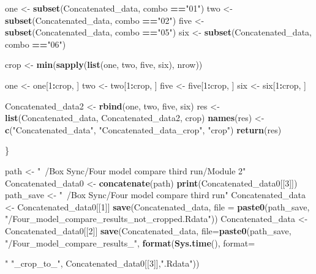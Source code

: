 \documentclass[]{book}
\newenvironment{Shaded}{\begin{snugshade}}{\end{snugshade}}
\newcommand{\KeywordTok}[1]{\textcolor[rgb]{0.13,0.29,0.53}{\textbf{{#1}}}}
\newcommand{\DataTypeTok}[1]{\textcolor[rgb]{0.13,0.29,0.53}{{#1}}}
\newcommand{\DecValTok}[1]{\textcolor[rgb]{0.00,0.00,0.81}{{#1}}}
\newcommand{\StringTok}[1]{\textcolor[rgb]{0.31,0.60,0.02}{{#1}}}
\newcommand{\OperatorTok}[1]{\textcolor[rgb]{0.81,0.36,0.00}{\textbf{{#1}}}}
\newcommand{\NormalTok}[1]{{#1}}
\theoremstyle{definition}
\theoremstyle{definition}
\theoremstyle{definition}
\theoremstyle{remark}
\begin{document}
\begin{Shaded}
\begin{Highlighting}[]
\NormalTok{ one <-}\StringTok{ }\KeywordTok{subset}\NormalTok{(Concatenated_data, combo }\OperatorTok{==}\StringTok{"01"}\NormalTok{)}
\NormalTok{ two <-}\StringTok{ }\KeywordTok{subset}\NormalTok{(Concatenated_data, combo }\OperatorTok{==}\StringTok{"02"}\NormalTok{)}
\NormalTok{ five <-}\StringTok{ }\KeywordTok{subset}\NormalTok{(Concatenated_data, combo }\OperatorTok{==}\StringTok{"05"}\NormalTok{)}
\NormalTok{ six <-}\StringTok{ }\KeywordTok{subset}\NormalTok{(Concatenated_data, combo }\OperatorTok{==}\StringTok{"06"}\NormalTok{)}

\NormalTok{ crop <-}\StringTok{ }\KeywordTok{min}\NormalTok{(}\KeywordTok{sapply}\NormalTok{(}\KeywordTok{list}\NormalTok{(one, two, five, six), nrow))}

\NormalTok{ one <-}\StringTok{ }\NormalTok{one[}\DecValTok{1}\OperatorTok{:}\NormalTok{crop, ]}
\NormalTok{ two <-}\StringTok{ }\NormalTok{two[}\DecValTok{1}\OperatorTok{:}\NormalTok{crop, ]}
\NormalTok{ five <-}\StringTok{ }\NormalTok{five[}\DecValTok{1}\OperatorTok{:}\NormalTok{crop, ]}
\NormalTok{ six <-}\StringTok{ }\NormalTok{six[}\DecValTok{1}\OperatorTok{:}\NormalTok{crop, ]}

\NormalTok{ Concatenated_data2 <-}\StringTok{ }\KeywordTok{rbind}\NormalTok{(one, two, five, six)}
\NormalTok{ res <-}\StringTok{ }\KeywordTok{list}\NormalTok{(Concatenated_data, Concatenated_data2, crop)}
 \KeywordTok{names}\NormalTok{(res) <-}\StringTok{ }\KeywordTok{c}\NormalTok{(}\StringTok{"Concatenated_data"}\NormalTok{, }\StringTok{"Concatenated_data_crop"}\NormalTok{, }\StringTok{"crop"}\NormalTok{)}
 \KeywordTok{return}\NormalTok{(res)}
 
\NormalTok{\}}

\NormalTok{path <-}\StringTok{ "~/Box Sync/Four model compare third run/Module 2"}
\NormalTok{Concatenated_data0 <-}\StringTok{ }\KeywordTok{concatenate}\NormalTok{(path)}
\KeywordTok{print}\NormalTok{(Concatenated_data0[[}\DecValTok{3}\NormalTok{]])}
\NormalTok{path_save <-}\StringTok{ "~/Box Sync/Four model compare third run"}
\NormalTok{Concatenated_data <-}\StringTok{ }\NormalTok{Concatenated_data0[[}\DecValTok{1}\NormalTok{]]}
\KeywordTok{save}\NormalTok{(Concatenated_data, }\DataTypeTok{file =} \KeywordTok{paste0}\NormalTok{(path_save,}
                                     \StringTok{"/Four_model_compare_results_not_cropped.Rdata"}\NormalTok{))}
\NormalTok{Concatenated_data <-}\StringTok{ }\NormalTok{Concatenated_data0[[}\DecValTok{2}\NormalTok{]]}
\KeywordTok{save}\NormalTok{(Concatenated_data, }\DataTypeTok{file=}\KeywordTok{paste0}\NormalTok{(path_save,}
                                   \StringTok{"/Four_model_compare_results_"}\NormalTok{, }
                                   \KeywordTok{format}\NormalTok{(}\KeywordTok{Sys.time}\NormalTok{(), }\DataTypeTok{format=}\StringTok{"%
                                   \StringTok{"_crop_to_"}\NormalTok{, Concatenated_data0[[}\DecValTok{3}\NormalTok{]],}\StringTok{".Rdata"}\NormalTok{))}

}
\end{Highlighting}
\end{Shaded}
\end{document}
